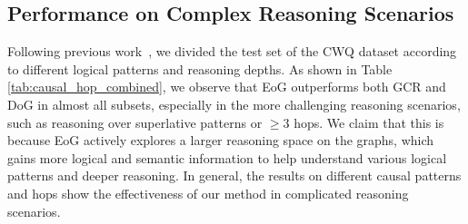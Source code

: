 \subsection{Performance on Complex Reasoning Scenarios}
Following previous work~\citep{luo2024graph},
we divided the test set of the CWQ dataset according to different logical patterns and reasoning depths.
As shown in Table \ref{tab:causal_hop_combined}, we observe that EoG outperforms both GCR and DoG in almost all subsets,
especially in the more challenging reasoning scenarios, such as reasoning over superlative patterns or $\geq3$ hops.
We claim that this is because EoG actively explores a larger reasoning space on the graphs, which gains more logical and semantic information to help understand various logical patterns and deeper reasoning.
In general, the results on different causal patterns and hops show the effectiveness of our method in complicated reasoning scenarios.                         
\begin{table}[h]
\centering
\caption{Performance (F1 scores) comparison on different logical patterns and reasoning depths.}
\label{tab:causal_hop_combined}
\end{table}

